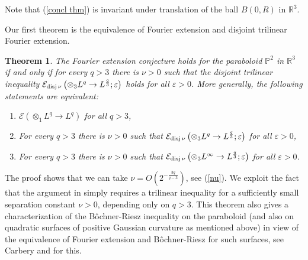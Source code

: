 \documentclass{amsart}%
\newtheorem{theorem}{Theorem}
\theoremstyle{plain}
\numberwithin{equation}{section}
\begin{document}
Note that (\ref{concl thm}) is invariant under translation of the ball
$B\left(  0,R\right)  $ in $\mathbb{R}^{3}$.

Our first theorem is the equivalence of Fourier extension and disjoint
trilinear Fourier extension.

\begin{theorem}
\label{main}The Fourier extension conjecture holds for the paraboloid
$\mathbb{P}^{2}$ in $\mathbb{R}^{3}$ \emph{if and only if} for every $q>3$
there is $\nu>0$ such that the disjoint trilinear inequality $\mathcal{E}%
_{\mathop{\rm disj}\nu}\left(  \otimes_{3}L^{q}\rightarrow L^{\frac{q}{3}%
};\varepsilon\right)  $ holds for all $\varepsilon>0$. More generally, the
following statements are equivalent:

\begin{enumerate}
\item $\mathcal{E}\left(  \otimes_{1}L^{q}\rightarrow L^{q}\right)  $ for all
$q>3$,

\item For every $q>3$ there is $\nu>0$ such that $\mathcal{E}_{\mathop{\rm
disj}\nu}\left(  \otimes_{3}L^{q}\rightarrow L^{\frac{q}{3}};\varepsilon
\right)  $ for all $\varepsilon>0$,

\item For every $q>3$ there is $\nu>0$ such that $\mathcal{E}_{\mathop{\rm
disj}\nu}\left(  \otimes_{3}L^{\infty}\rightarrow L^{\frac{q}{3}}%
;\varepsilon\right)  $ for all $\varepsilon>0$.
\end{enumerate}
\end{theorem}

The proof shows that we can take $\nu=O\left(  2^{-\frac{3q}{q-3}}\right)  $,
see (\ref{nu}). We exploit the fact that the argument in \cite[See the Remark
after (6.19) on page 1248.]{BoGu} simply requires a trilinear inequality for a
sufficiently small separation constant $\nu>0$, depending only on $q>3$. This
theorem also gives a characterization of the B\^{o}chner-Riesz inequality on
the paraboloid (and also on quadratic surfaces of positive Gaussian curvature
as mentioned above) in view of the equivalence of Fourier extension and
B\^{o}chner-Riesz for such surfaces, see Carbery \cite{Car} and \cite{Tao} for this.
\end{document}
